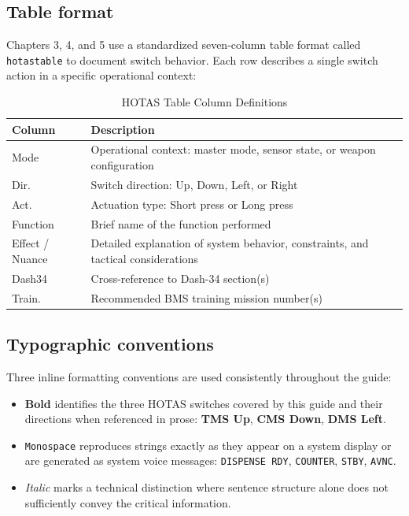 \documentclass[11pt, a4paper, twoside]{report}
\begin{document}
\subsection{Table format}
\label{sec:C1-S3-S2}

Chapters 3, 4, and 5 use a standardized seven-column table format called \texttt{hotastable} to document switch behavior. Each row describes a single switch action in a specific operational context:

\begin{table}[H]
	\centering
	\caption{HOTAS Table Column Definitions}
	\label{tab:C1-hotastable-format}
	\small
	\renewcommand{\arraystretch}{1.25}
	\begin{tabular}{L{2.2cm} L{11.5cm}}
		\toprule
		\textbf{Column} & \textbf{Description} \\
		\midrule
		Mode & Operational context: master mode, sensor state, or weapon configuration \\
		Dir. & Switch direction: Up, Down, Left, or Right \\
		Act. & Actuation type: Short press or Long press \\
		Function & Brief name of the function performed \\
		Effect / Nuance & Detailed explanation of system behavior, constraints, and tactical considerations \\
		Dash34 & Cross-reference to Dash-34 section(s) \\
		Train. & Recommended BMS training mission number(s) \\
		\bottomrule
	\end{tabular}
\end{table}

\subsection{Typographic conventions}
\label{sec:C1-S3-S3}

Three inline formatting conventions are used consistently throughout the guide:

\begin{itemize}
	\item \textbf{Bold} identifies the three HOTAS switches covered by this guide and their directions when referenced in prose: \textbf{TMS Up}, \textbf{CMS Down}, \textbf{DMS Left}.
	\item \texttt{Monospace} reproduces strings exactly as they appear on a system display or are generated as system voice messages: \texttt{DISPENSE RDY}, \texttt{COUNTER}, \texttt{STBY}, \texttt{AVNC}.
	\item \textit{Italic} marks a technical distinction where sentence structure alone does not sufficiently convey the critical information.
\end{itemize}
\end{document}
